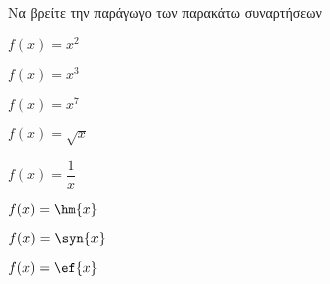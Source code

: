 Να βρείτε την παράγωγο των παρακάτω συναρτήσεων
\begin{multicols}{2}
\begin{alist}
\item $ f(x)=x^2 $
\item $ f(x)=x^3 $
\item $ f(x)=x^7 $
\item $ f(x)=\sqrt{x} $
\item $ f(x)=\dfrac{1}{x} $
\item $ f(x)=\hm{x} $
\item $ f(x)=\syn{x} $
\item $ f(x)=\ef{x} $
\end{alist}
\end{multicols}
